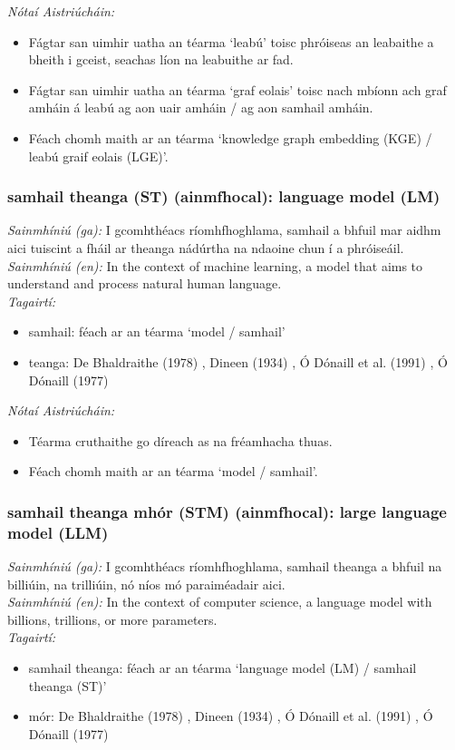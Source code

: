  \noindent \textit{Nótaí Aistriúcháin:}
\begin{itemize}
	\item Fágtar san uimhir uatha an téarma `leabú' toisc phróiseas an leabaithe a bheith i gceist, seachas líon na leabuithe ar fad.
	\item Fágtar san uimhir uatha an téarma `graf eolais' toisc nach mbíonn ach graf amháin á leabú ag aon uair amháin / ag aon samhail amháin.
	\item Féach chomh maith ar an téarma `knowledge graph embedding (KGE) / leabú graif eolais (LGE)'.
\end{itemize}


\subsubsection*{samhail theanga (ST) (ainmfhocal): language model (LM)}
 \noindent \textit{Sainmhíniú (ga):} I gcomhthéacs ríomhfhoghlama, samhail a bhfuil mar aidhm aici tuiscint a fháil ar theanga nádúrtha na ndaoine chun í a phróiseáil.
\\
 \noindent \textit{Sainmhíniú (en):} In the context of machine learning, a model that aims to understand and process natural human language.
\\
 \noindent \textit{Tagairtí:}
\begin{itemize}
	\item samhail: féach ar an téarma `model / samhail'
	\item teanga: De Bhaldraithe (1978) \cite{de-bhaldraithe}, Dineen (1934) \cite{dineen}, Ó Dónaill et al. (1991) \cite{focloir-beag}, Ó Dónaill (1977) \cite{odonaill}
\end{itemize}

 \noindent \textit{Nótaí Aistriúcháin:}
\begin{itemize}
	\item Téarma cruthaithe go díreach as na fréamhacha thuas.
	\item Féach chomh maith ar an téarma `model / samhail'.
\end{itemize}


\subsubsection*{samhail theanga mhór (STM) (ainmfhocal): large language model (LLM)}
 \noindent \textit{Sainmhíniú (ga):} I gcomhthéacs ríomhfhoghlama, samhail theanga a bhfuil na billiúin, na trilliúin, nó níos mó paraiméadair aici.
\\
 \noindent \textit{Sainmhíniú (en):} In the context of computer science, a language model with billions, trillions, or more parameters.
\\
 \noindent \textit{Tagairtí:}
\begin{itemize}
	\item samhail theanga: féach ar an téarma `language model (LM) / samhail theanga (ST)'
	\item mór: De Bhaldraithe (1978) \cite{de-bhaldraithe}, Dineen (1934) \cite{dineen}, Ó Dónaill et al. (1991) \cite{focloir-beag}, Ó Dónaill (1977) \cite{odonaill}
\end{itemize}

